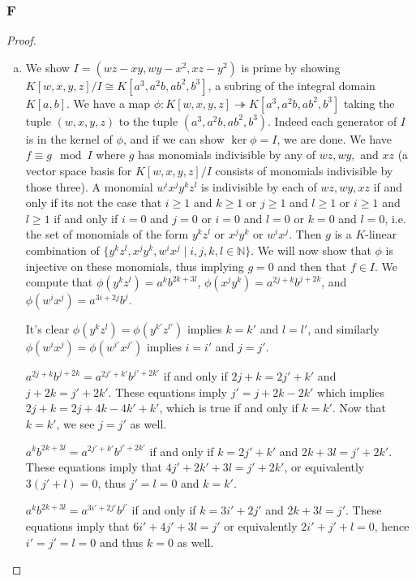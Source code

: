 \documentclass{article}
\newcommand{\N}{\mathbb{N}}
\begin{document}
\subsubsection{F}\label{3.6.F}
\begin{proof}
    \begin{enumerate}[(a)]
        \item We show $I=(wz-xy,wy-x^2, xz-y^2)$ is prime by showing $K[w,x,y,z]/I\cong K[a^3, a^2b, ab^2, b^3]$, a subring of the integral domain $K[a,b]$. We have a map $\phi:K[w,x,y,z]\twoheadrightarrow K[a^3, a^2b, ab^2, b^3]$ taking the tuple $(w,x,y,z)$ to the tuple $(a^3, a^2b, ab^2, b^3)$. Indeed each generator of $I$ is in the kernel of $\phi$, and if we can show $\ker \phi=I$, we are done. We have $f\equiv g \mod I$ where $g$ has monomials indivisible by any of $wz, wy,$ and $xz$ (a vector space basis for $K[w,x,y,z]/I$ consists of monomials indivisible by those three). A monomial $w^i x^j y^k z^l$ is indivisible by each of $wz, wy, xz$ if and only if its not the case that $i\ge 1$ and $k\ge 1$ or $j\ge 1$ and $l\ge 1$ or $i\ge 1$ and $l\ge 1$ if and only if $i=0$ and $j=0$ or $i=0$ and $l=0$ or $k=0$ and $l=0$, i.e. the set of monomials of the form $y^kz^l$ or $x^jy^k$ or $w^ix^j$. Then $g$ is a $K$-linear combination of $\{y^kz^l, x^jy^k, w^ix^j \mid i,j,k,l\in \N\}$. We will now show that $\phi$ is injective on these monomials, thus implying $g=0$ and then that $f\in I$. We compute that $\phi(y^k z^l)=a^k b^{2k+3l}$, $\phi(x^j y^k)= a^{2j+k}b^{j+2k}$, and $\phi(w^i x^j)=a^{3i+2j}b^j$. 
        
        It's clear $\phi(y^k z^l)=\phi(y^{k'} z^{l'})$ implies $k=k'$ and $l=l'$, and similarly $\phi(w^i x^j)=\phi(w^{i'} x^{j'})$ implies $i=i'$ and $j=j'$.

        \vspace{0.1in}
        $a^{2j+k} b^{j+2k}=a^{2j'+k'} b^{j'+2k'}$ if and only if $2j+k=2j'+k'$ and $j+2k=j'+2k'$. These equations imply $j'=j+2k-2k'$ which implies $2j+k=2j+4k-4k'+k'$, which is true if and only if $k=k'$. Now that $k=k'$, we see $j=j'$ as well.

        \vspace{0.1in}
        $a^k b^{2k+3l}= a^{2j'+k'} b^{j'+2k'}$ if and only if $k=2j'+k'$ and $2k+3l=j'+2k'$. These equations imply that $4j'+2k'+3l=j'+2k'$, or equivalently $3(j'+l)=0$, thus $j'=l=0$ and $k=k'$.
        
        \vspace{0.1in}
        $a^k b^{2k+3l}=a^{3i'+2j'} b^{j'}$ if and only if $k=3i'+2j'$ and $2k+3l=j'$. These equations imply that $6i'+4j'+3l=j'$ or equivalently $2i'+j'+l=0$, hence $i'=j'=l=0$ and thus $k=0$ as well.


\end{enumerate}
\end{proof}
\end{document}

